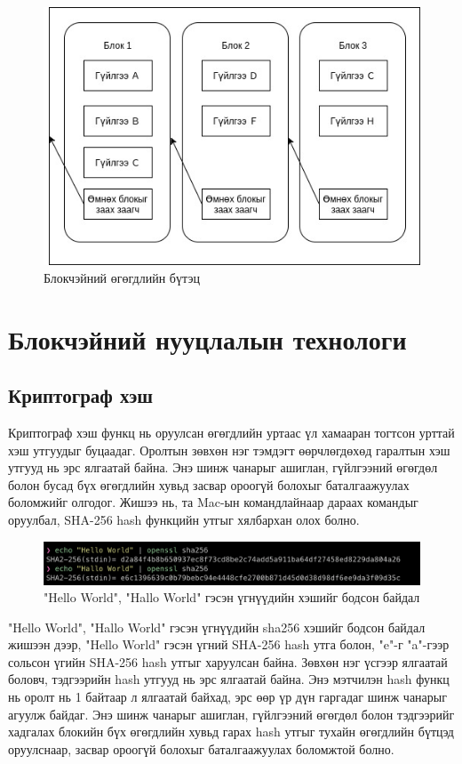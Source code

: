 \begin{figure}[h]
	\centering
	\includegraphics[scale=0.6]{src/images/blockchain-structure.jpg}
	\caption{Блокчэйний өгөгдлийн бүтэц}
\end{figure}

\section{Блокчэйний нууцлалын технологи}
\subsection{Криптограф хэш}
Криптограф хэш функц нь оруулсан өгөгдлийн уртаас үл хамааран тогтсон урттай хэш утгуудыг буцаадаг. Оролтын зөвхөн нэг тэмдэгт өөрчлөгдөхөд гаралтын хэш утгууд нь эрс ялгаатай байна. Энэ шинж чанарыг ашиглан, гүйлгээний өгөгдөл болон бусад бүх өгөгдлийн хувьд засвар ороогүй болохыг баталгаажуулах боломжийг олгодог.
Жишээ нь, та Mac-ын командлайнаар дараах командыг оруулбал, SHA-256 hash функцийн утгыг хялбархан олох болно.

\begin{figure}[h]
	\centering
	\includegraphics[scale=0.36]{src/images/hash-example.png}
	\caption{"Hello World", "Hallo World" гэсэн үгнүүдийн хэшийг бодсон байдал}
\end{figure}

"Hello World", "Hallo World" гэсэн үгнүүдийн sha256 хэшийг бодсон байдал жишээн дээр, "Hello World" гэсэн үгний SHA-256 hash утга болон, "e"-г "a"-гээр сольсон үгийн SHA-256 hash утгыг харуулсан байна. Зөвхөн нэг үсгээр ялгаатай боловч, тэдгээрийн hash утгууд нь эрс ялгаатай байна. Энэ мэтчилэн hash функц нь оролт нь 1 байтаар л ялгаатай байхад, эрс өөр үр дүн гаргадаг шинж чанарыг агуулж байдаг. Энэ шинж чанарыг ашиглан, гүйлгээний өгөгдөл болон тэдгээрийг хадгалах блокийн бүх өгөгдлийн хувьд гарах hash утгыг тухайн өгөгдлийн бүтцэд оруулснаар, засвар ороогүй болохыг баталгаажуулах боломжтой болно.

